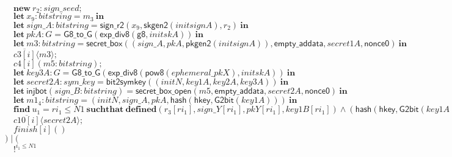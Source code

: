 \documentclass{article}
\newcommand{\cinput}[2]{{#1}({#2})}
\newcommand{\coutput}[2]{\overline{#1}\langle{#2}\rangle}
\newcommand{\kw}[1]{\mathbf{#1}}
\newcommand{\kwf}[1]{\mathsf{#1}}
\newcommand{\var}[1]{\mathit{#1}}
\newcommand{\kwt}[1]{\mathit{#1}}
\newcommand{\kwp}[1]{\mathit{#1}}
\newcommand{\kwc}[1]{\mathit{#1}}
\begin{document}
\begin{tabbing}
\>$\quad \kw{new}\ \var{r}_{2}: \kwt{sign{\_}seed};$\\
\>$\quad \kw{let}\ \var{x}_{9}: \kwt{bitstring} = \var{m}_{3}\ \kw{in}$\\
\>$\quad \kw{let}\ \var{sign{\_}A}: \kwt{bitstring} = \kwf{sign{\_}r2}(\var{x}_{9}, \kwf{skgen2}(\var{initsignA}), \var{r}_{2})\ \kw{in}$\\
\>$\quad \kw{let}\ \var{pkA}: \kwt{G} = \kwf{G8{\_}to{\_}G}(\kwf{exp{\_}div8}(\kwf{g8}, \var{initskA}))\ \kw{in}$\\
\>$\quad \kw{let}\ \var{m3}: \kwt{bitstring} = \kwf{secret{\_}box}(\kwf{}(\var{sign{\_}A}, \var{pkA}, \kwf{pkgen2}(\var{initsignA})), \kwf{empty{\_}addata}, \var{secret1A}, \kwf{nonce0})\ \kw{in}$\\
\>$\quad \coutput{\kwc{c3}[\var{i}]}{\var{m3}};$\\
\>$\quad \cinput{\kwc{c4}[\var{i}]}{\var{m5}: \kwt{bitstring}};$\\
\>$\quad \kw{let}\ \var{key3A}: \kwt{G} = \kwf{G8{\_}to{\_}G}(\kwf{exp{\_}div8}(\kwf{pow8}(\var{ephemeral{\_}pkX}), \var{initskA}))\ \kw{in}$\\
\>$\quad \kw{let}\ \var{secret2A}: \kwt{sym{\_}key} = \kwf{bit2symkey}(\kwf{}(\var{initN}, \var{key1A}, \var{key2A}, \var{key3A}))\ \kw{in}$\\
\>$\quad \kw{let}\ \kwf{injbot}(\var{sign{\_}B}: \kwt{bitstring}) = \kwf{secret{\_}box{\_}open}(\var{m5}, \kwf{empty{\_}addata}, \var{secret2A}, \kwf{nonce0})\ \kw{in}$\\
\>$\quad \kw{let}\ \var{m1}_{4}: \kwt{bitstring} = \kwf{}(\var{initN}, \var{sign{\_}A}, \var{pkA}, \kwf{hash}(\kwf{hkey}, \kwf{G2bit}(\var{key1A})))\ \kw{in}$\\
\>$\quad \kw{find}\ \var{u}_{1} = \var{ri}_{1} \leq \kwp{N1}\ \kw{suchthat}\ \kw{defined}(\var{r}_{3}[\var{ri}_{1}], \var{sign{\_}Y}[\var{ri}_{1}], \var{pkY}[\var{ri}_{1}], \var{key1B}[\var{ri}_{1}])\wedge (\kwf{hash}(\kwf{hkey}, \kwf{G2bit}(\var{key1A}))  =  \kwf{hash}(\kwf{hkey}, \kwf{G2bit}(\var{key1B}[\var{ri}_{1}]))) \wedge  (\var{pkA}  =  \var{pkY}[\var{ri}_{1}]) \wedge  (\var{sign{\_}A}  =  \var{sign{\_}Y}[\var{ri}_{1}]) \wedge  \kwf{check2}(\var{m1}_{4}, \kwf{pkgen2}(\var{initsignB}), \var{sign{\_}B})\ \kw{then}$\\
\>$\quad \coutput{\kwc{c10}[\var{i}]}{\var{secret2A}};$\\
\>$\quad \cinput{\kwc{finish}[\var{i}]}{}$\\
\>$) \mid ($\\
\>$\quad !^{\var{i}_{1} \leq \kwp{N1}}$\\

\end{tabbing}
\end{document}
